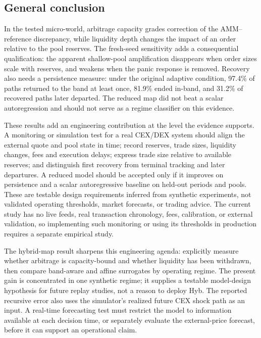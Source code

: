 \begin{samepage}
\section{General conclusion}

In the tested micro-world, arbitrage capacity grades correction of the AMM–reference discrepancy, while liquidity depth changes the impact of an order relative to the pool reserves. The fresh-seed sensitivity adds a consequential qualification: the apparent shallow-pool amplification disappears when order sizes scale with reserves, and weakens when the panic response is removed. Recovery also needs a persistence measure: under the original adaptive condition, 97.4\% of paths returned to the band at least once, 81.9\% ended in-band, and 31.2\% of recovered paths later departed. The reduced map did not beat a scalar autoregression and should not serve as a regime classifier on this evidence.

These results add an engineering contribution at the level the evidence supports. A monitoring or simulation test for a real CEX/DEX system should align the external quote and pool state in time; record reserves, trade sizes, liquidity changes, fees and execution delays; express trade size relative to available reserves; and distinguish first recovery from terminal tracking and later departures. A reduced model should be accepted only if it improves on persistence and a scalar autoregressive baseline on held-out periods and pools. These are testable design requirements inferred from synthetic experiments, not validated operating thresholds, market forecasts, or trading advice. The current study has no live feeds, real transaction chronology, fees, calibration, or external validation, so implementing such monitoring or using its thresholds in production requires a separate empirical study.

The hybrid-map result sharpens this engineering agenda: explicitly measure whether arbitrage is capacity-bound and whether liquidity has been withdrawn, then compare band-aware and affine surrogates by operating regime. The present gain is concentrated in one synthetic regime; it supplies a testable model-design hypothesis for future replay studies, not a reason to deploy Hyb. The reported recursive error also uses the simulator's realized future CEX shock path as an input. A real-time forecasting test must restrict the model to information available at each decision time, or separately evaluate the external-price forecast, before it can support an operational claim.

\end{samepage}

